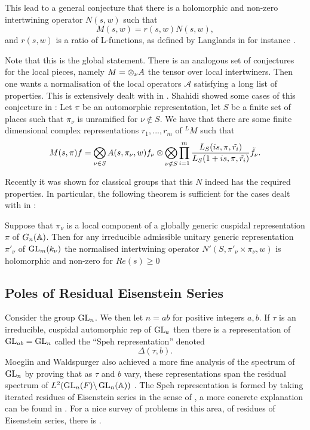 This lead to a general conjecture that there is a holomorphic and non-zero intertwining operator \(N(s, w)\) such that 
\[M(s, w) = r(s, w)N(s,w),\]
and \(r(s, w)\) is a ratio of L-functions, as defined by Langlands in for instance \cite{langlandsEulerProducts1971}.

Note that this is the global statement. There is an analogous set of conjectures for the local pieces, namely \(M = \otimes_\nu A\) the tensor over local intertwiners. Then one wants a normalisation of the local operators \(\mathscr{A}\) satisfying a long list of properties. This is extensively dealt with in \cite{shahidiProofLanglandsConjecture1990}. Shahidi showed some cases of this conjecture in \cite{shahidiRamanujanConjectureFiniteness1988a}: Let \(\pi\) be an automorphic representation, let \(S\) be a finite set of places such that \(\pi_\nu\) is unramified for \(\nu\notin S\). We have that there are some finite dimensional complex representations \(r_1, ..., r_m\) of \(^LM\) such that 
\[M(s, \pi)f = \bigotimes_{\nu\in S}A(s, \pi_\nu, w)f_\nu \otimes \bigotimes_{\nu\notin S} \prod_{i=1}^{m}\frac{L_S(is, \pi, \tilde{r_i})}{L_S(1+is, \pi, \tilde{r_i})} \tilde{f}_\nu.\]

Recently it was shown for classical groups that this \(N\) indeed has the required properties. In particular, the following theorem is sufficient for the cases dealt with in \cite{jiangPolesCertainResidual2013}:
\begin{Theorem}
	Suppose that \(\pi_\nu\) is a local component of a globally generic cuspidal representation \(\pi\) of \(G_n(\A)\). Then for any irreducible admissible unitary generic representation \(\pi'_\nu\) of \(\operatorname{GL}_m(k_\nu)\) the normalised intertwining operator \(N'(S, \pi'_\nu\times \pi_\nu, w)\) is holomorphic and non-zero for \(Re(s)\geq 0\)
\end{Theorem}

\subsection{Poles of Residual Eisenstein Series}
Consider the group \(\operatorname{GL}_n\). We then let \(n = ab\) for positive integers \(a,b\). If \(\tau\) is an irreducible, cuspidal automorphic rep of \(\operatorname{GL}_a\) then there is a representation of \(\operatorname{GL}_{ab} = \operatorname{GL}_n\) called the ``Speh representation'' denoted 
\[\Delta(\tau, b).\]
Moeglin and Waldspurger also achieved a more fine analysis of the spectrum of \(\operatorname{GL}_n\) by proving that as \(\tau\) and \(b\) vary, these representations span the residual spectrum of \(L^2(\GL_n(F) \backslash \GL_n(\A))\) \cite[Thm. 1.1]{jiangPolesCertainResidual2013}. The Speh representation is formed by taking iterated residues of Eisenstein series in the sense of \cite[V]{moeglinSpectralDecompositionEisenstein1995}, a more concrete explanation can be found in \cite[2.4]{brennerNotesAnalyticProperties2009}. For a nice survey of problems in this area, of residues of Eisenstein series, there is \cite{jiangResiduesEisensteinSeries2008a}.


